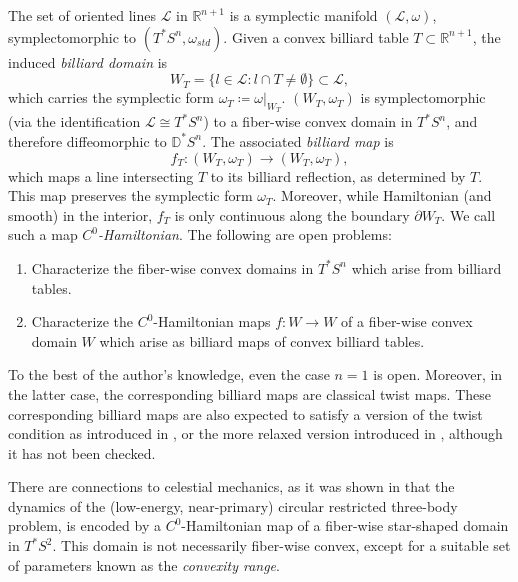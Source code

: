 \documentclass[11pt]{article}
\theoremstyle{definition}
\begin{document}
The set of oriented lines $\mathcal{L}$ in $\mathbb R^{n+1}$ is a symplectic manifold $(\mathcal{L},\omega)$, symplectomorphic to $(T^*S^n,\omega_{std})$. Given a convex billiard table $T\subset \mathbb R^{n+1}$, the induced \emph{billiard domain} is
$$
W_T=\{l \in \mathcal{L}: l \cap T\neq \emptyset\}\subset \mathcal L,
$$
which carries the symplectic form $\omega_T\coloneq\omega\vert_{W_T}$. $(W_T,\omega_T)$ is symplectomorphic (via the identification $\mathcal L \cong T^*S^n$) to a fiber-wise convex domain in $T^*S^n$, and therefore diffeomorphic to $\mathbb D^*S^n$. The associated \emph{billiard map} is
$$
f_T: (W_T,\omega_T)\rightarrow (W_T,\omega_T),
$$
which maps a line intersecting $T$ to its billiard reflection, as determined by $T$. This map preserves the symplectic form $\omega_T$. Moreover, while Hamiltonian (and smooth) in the interior, $f_T$ is only continuous along the boundary $\partial W_T$. We call such a map \emph{$C^0$-Hamiltonian}. The following are open problems:

\begin{enumerate}
    \item Characterize the fiber-wise convex domains in $T^*S^n$ which arise from billiard tables.
    \item Characterize the $C^0$-Hamiltonian maps $f: W \rightarrow W$ of a fiber-wise convex domain $W$ which arise as billiard maps of convex billiard tables.
\end{enumerate}

To the best of the author's knowledge, even the case $n=1$ is open. Moreover, in the latter case, the corresponding billiard maps are classical twist maps. These corresponding billiard maps are also expected to satisfy a version of the twist condition as introduced in \cite{GPB}, or the more relaxed version introduced in \cite{LM25}, although it has not been checked. 

There are connections to celestial mechanics, as it was shown in \cite{MvK} that the dynamics of the (low-energy, near-primary) circular restricted three-body problem, is encoded by a $C^0$-Hamiltonian map of a fiber-wise star-shaped domain in $T^*S^2$. This domain is not necessarily fiber-wise convex, except for a suitable set of parameters known as the \emph{convexity range}.

\end{document}

